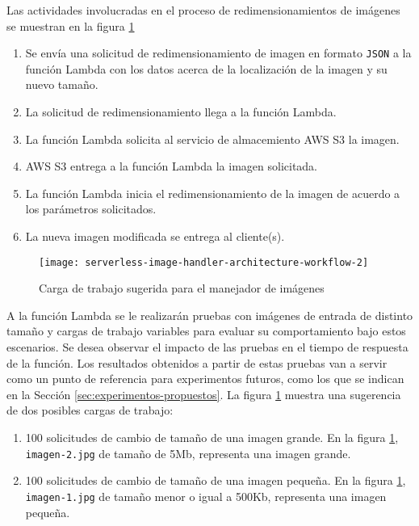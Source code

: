 Las actividades involucradas en el proceso de redimensionamientos de imágenes se muestran en la figura \ref{fig:serverless-image-handler-architecture-workflow}
\begin{enumerate}
    \item Se envía una solicitud de redimensionamiento de imagen en formato \texttt{JSON} a la función Lambda con los datos acerca de la localización de la imagen y su nuevo tamaño.
    \item La solicitud de redimensionamiento llega a la función Lambda.
    \item La función Lambda solicita al servicio de almacemiento AWS S3 la imagen.
    \item AWS S3 entrega a la función Lambda la imagen solicitada.
    \item La función Lambda inicia el redimensionamiento de la imagen de acuerdo a los parámetros solicitados.
    \item La nueva imagen modificada se entrega al cliente(s).
\end{enumerate}

\begin{figure}[h]
  \centering
  \texttt{[image: serverless-image-handler-architecture-workflow-2]}
  \caption[Carga de trabajo sugerida para el manejador de imágenes]{Carga de trabajo sugerida para el manejador de imágenes}
  \label{fig:serverless-image-handler-architecture-workflow}
\end{figure}


A la función Lambda se le realizarán pruebas con imágenes de entrada de distinto tamaño y cargas de trabajo variables para evaluar su comportamiento bajo estos escenarios. Se desea observar el impacto de las pruebas en el tiempo de respuesta de la función. Los resultados obtenidos a partir de estas pruebas van a servir como un punto de referencia para experimentos futuros, como los que se indican en la Sección \ref{sec:experimentos-propuestos}. La figura \ref{fig:serverless-image-handler-architecture-workflow} muestra una sugerencia de dos posibles cargas de trabajo: 

\begin{enumerate}
    \item 100 solicitudes de cambio de tamaño de una imagen grande. En la figura \ref{fig:serverless-image-handler-architecture-workflow}, \texttt{imagen-2.jpg} de tamaño de 5Mb, representa una imagen grande.
    \item 100 solicitudes de cambio de tamaño de una imagen pequeña. En la figura \ref{fig:serverless-image-handler-architecture-workflow}, \texttt{imagen-1.jpg} de tamaño menor o igual a 500Kb, representa una imagen pequeña.
\end{enumerate}

